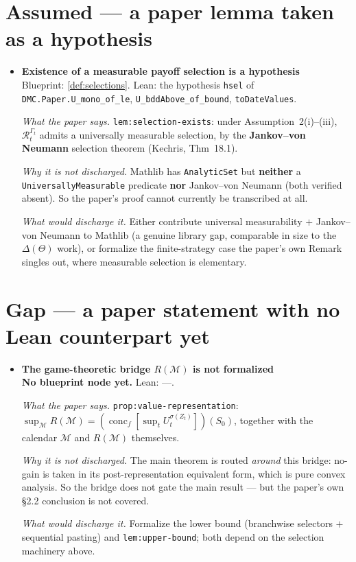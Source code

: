 \section*{Assumed --- a paper lemma taken as a hypothesis}
\begin{itemize}
  \item[] \textbf{Existence of a measurable payoff selection is a hypothesis}\\
  Blueprint: \ref{def:selections}. Lean: the hypothesis \texttt{hsel} of \texttt{DMC.Paper.U\_mono\_of\_le}, \texttt{U\_bddAbove\_of\_bound}, \texttt{toDateValues}.
  \par\smallskip\emph{What the paper says.} \texttt{lem:selection-exists}: under Assumption~2(i)--(iii), $\mathcal R_t^{\Gamma_t}$ admits a universally measurable selection, by the \textbf{Jankov--von Neumann} selection theorem (Kechris, Thm~18.1).
  \par\smallskip\emph{Why it is not discharged.} Mathlib has \texttt{AnalyticSet} but \textbf{neither} a \texttt{UniversallyMeasurable} predicate \textbf{nor} Jankov--von Neumann (both verified absent). So the paper's proof cannot currently be transcribed at all.
  \par\smallskip\emph{What would discharge it.} Either contribute universal measurability $+$ Jankov--von Neumann to Mathlib (a genuine library gap, comparable in size to the $\Delta(\Theta)$ work), or formalize the finite-strategy case the paper's own Remark singles out, where measurable selection is elementary.
\end{itemize}

\section*{Gap --- a paper statement with no Lean counterpart yet}
\begin{itemize}
  \item[] \textbf{The game-theoretic bridge $R(\mathcal M)$ is not formalized}\\
  \textbf{No blueprint node yet.} Lean: ---.
  \par\smallskip\emph{What the paper says.} \texttt{prop:value-representation}: $\sup_{\mathcal M}R(\mathcal M)=(\operatorname{conc}_f[\sup_t U_t^{\sigma(Z_t)}])(S_0)$, together with the calendar $\mathcal M$ and $R(\mathcal M)$ themselves.
  \par\smallskip\emph{Why it is not discharged.} The main theorem is routed \emph{around} this bridge: no-gain is taken in its post-representation equivalent form, which is pure convex analysis. So the bridge does not gate the main result --- but the paper's own \S2.2 conclusion is not covered.
  \par\smallskip\emph{What would discharge it.} Formalize the lower bound (branchwise selectors $+$ sequential pasting) and \texttt{lem:upper-bound}; both depend on the selection machinery above.
\end{itemize}


